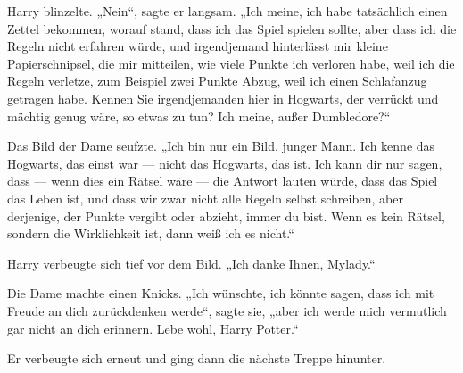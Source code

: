 Harry blinzelte.
„Nein“, sagte er langsam.
„Ich meine, ich habe tatsächlich einen Zettel bekommen, worauf stand, dass ich das Spiel spielen sollte, aber dass ich die Regeln nicht erfahren würde, und irgendjemand hinterlässt mir kleine Papierschnipsel, die mir mitteilen, wie viele Punkte ich verloren habe, weil ich die Regeln verletze, zum Beispiel zwei Punkte Abzug, weil ich einen Schlafanzug getragen habe. Kennen Sie irgendjemanden hier in Hogwarts, der verrückt und mächtig genug wäre, so etwas zu tun? Ich meine, außer Dumbledore?“

Das Bild der Dame seufzte.
„Ich bin nur ein Bild, junger Mann. Ich kenne das Hogwarts, das einst war — nicht das Hogwarts, das ist. Ich kann dir nur sagen, dass — wenn dies ein Rätsel wäre — die Antwort lauten würde, dass das Spiel das Leben ist, und dass wir zwar nicht alle Regeln selbst schreiben, aber derjenige, der Punkte vergibt oder abzieht, immer du bist. Wenn es kein Rätsel, sondern die Wirklichkeit ist, dann weiß ich es nicht.“

Harry verbeugte sich tief vor dem Bild.
„Ich danke Ihnen, Mylady.“

Die Dame machte einen Knicks.
„Ich wünschte, ich könnte sagen, dass ich mit Freude an dich zurückdenken werde“, sagte sie, „aber ich werde mich vermutlich gar nicht an dich erinnern. Lebe wohl, Harry Potter.“

Er verbeugte sich erneut und ging dann die nächste Treppe hinunter.

